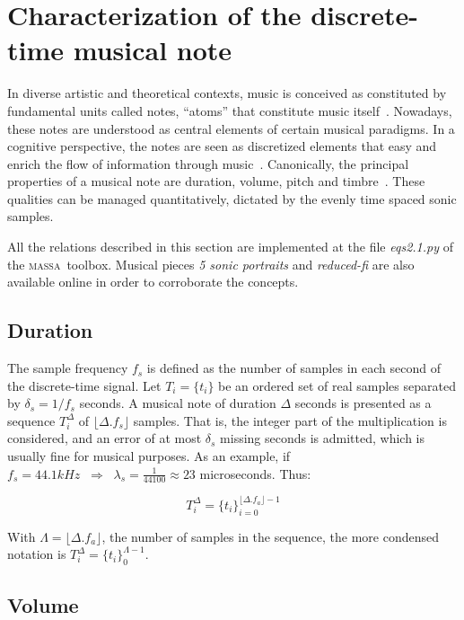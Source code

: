 \documentclass[
 aip,
 jmp,
 amsmath,amssymb,
 reprint,
]{revtex4-1}
\newcommand{\massa}{{\large \textsc{massa}}}
\begin{document}
\section{Characterization of the discrete-time musical note} \label{sec:discNote}

In diverse artistic and theoretical contexts, music is conceived as constituted by fundamental units called notes, ``atoms'' that constitute music itself~\cite{Wisnick, Lovelock, Webern}.
Nowadays, these notes are understood as central elements of certain musical paradigms. In a cognitive perspective, the notes are seen as discretized elements that easy and enrich the flow of information through music~\cite{Roederer, Lacerda}.
Canonically, the principal properties of a musical note are duration, volume, pitch and timbre~\cite{Lacerda}. These qualities can be managed quantitatively, dictated by the evenly time spaced sonic samples.

All the relations described in this section are implemented at the file \emph{eqs2.1.py} of the \massa\ toolbox. Musical pieces \emph{5 sonic portraits} and \emph{reduced-fi} are also available online in order to corroborate the concepts.

\subsection{Duration}

The sample frequency $f_s$ is defined as the number of samples in each second of the discrete-time signal. Let $T_i=\{t_i\}$ be an ordered set of real samples separated by $\delta_s=1/f_s$ seconds. A musical note of duration $\Delta$ seconds is presented as a sequence $T_i^{\Delta}$ of $\lfloor \Delta . f_s \rfloor $ samples. That is, the integer part of the multiplication is considered, and an error of at most $\delta_s$ missing seconds is admitted, which is usually fine for musical purposes. As an example, if $f_s=44.1kHz \;\;\Rightarrow\;\;\lambda_s=\frac{1}{44100}\approx 23$ microseconds. Thus:


\begin{equation}\label{eq:dur}
T_{i}^{\Delta}={\{t_i\}}_{i=0}^{\lfloor \Delta . f_a \rfloor -1}
\end{equation}

With $\Lambda=\lfloor \Delta . f_a \rfloor$, the number of samples in the sequence, the more condensed notation is $T_i^\Delta=\{t_i\}_0^{\Lambda-1}$.

\subsection{Volume}\label{subsec:volume}
\end{document}
